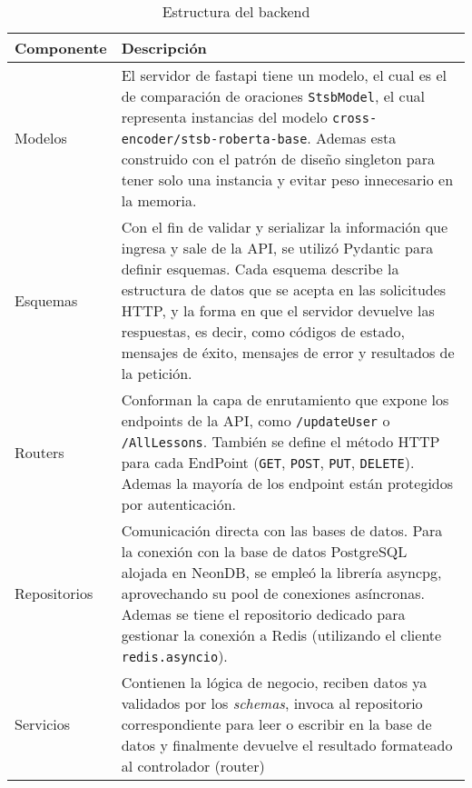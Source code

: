 \begin{table}[H]
\begin{center}
\begin{tabular}{|p{5cm}|p{10cm}|}
\hline
\textbf{Componente} & \textbf{Descripción} \\
\hline
Modelos & El servidor de fastapi tiene un modelo, el cual es el de comparación de oraciones \texttt{StsbModel}, el cual representa instancias del modelo \texttt{cross-encoder/stsb-roberta-base}. Ademas esta construido con el patrón de diseño singleton para tener solo una instancia y evitar peso innecesario en la memoria.\\
\hline
Esquemas & Con el fin de validar y serializar la información que ingresa y sale de la API, se utilizó Pydantic para definir esquemas. Cada esquema describe  la estructura de datos que se acepta en las solicitudes HTTP, y la forma en que el servidor devuelve las respuestas, es decir, como códigos de estado, mensajes de éxito, mensajes de error y resultados de la petición. \\
\hline
Routers & Conforman la capa de enrutamiento que expone los endpoints de la API, como \texttt{/updateUser} o \texttt{/AllLessons}. También se define el método HTTP para cada EndPoint (\texttt{GET}, \texttt{POST}, \texttt{PUT}, \texttt{DELETE}). Ademas la mayoría de los endpoint están protegidos por autenticación.  \\
\hline
Repositorios & Comunicación directa con las bases de datos. Para la conexión con la base de datos PostgreSQL alojada en NeonDB, se empleó la librería asyncpg, aprovechando su pool de conexiones asíncronas. Ademas se tiene el repositorio dedicado para gestionar la conexión a Redis (utilizando el cliente \texttt{redis.asyncio}). \\
\hline
Servicios & Contienen la lógica de negocio, reciben datos ya validados por los \textit{schemas}, invoca al repositorio correspondiente para leer o escribir en la base de datos y finalmente devuelve el resultado formateado al controlador (router) \\
\hline

\end{tabular}
  \caption{Estructura del backend}
\label{fig:estructurabackend}
\end{center}
\end{table}

